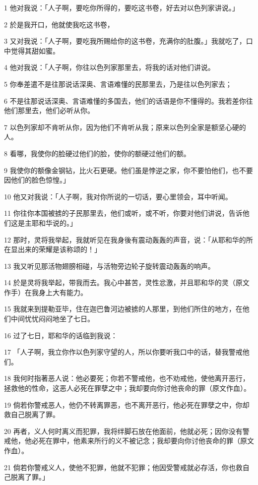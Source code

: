 \par 1 他对我说：「人子啊，要吃你所得的，要吃这书卷，好去对以色列家讲说。」
\par 2 於是我开口，他就使我吃这书卷，
\par 3 又对我说：「人子啊，要吃我所赐给你的这书卷，充满你的肚腹。」我就吃了，口中觉得其甜如蜜。
\par 4 他对我说：「人子啊，你往以色列家那里去，将我的话对他们讲说。
\par 5 你奉差遣不是往那说话深奥、言语难懂的民那里去，乃是往以色列家去；
\par 6 不是往那说话深奥、言语难懂的多国去，他们的话语是你不懂得的。我若差你往他们那里去，他们必听从你。
\par 7 以色列家却不肯听从你，因为他们不肯听从我；原来以色列全家是额坚心硬的人。
\par 8 看哪，我使你的脸硬过他们的脸，使你的额硬过他们的额。
\par 9 我使你的额像金钢钻，比火石更硬。他们虽是悖逆之家，你不要怕他们，也不要因他们的脸色惊惶。」
\par 10 他又对我说：「人子啊，我对你所说的一切话，要心里领会，耳中听闻。
\par 11 你往你本国被掳的子民那里去，他们或听，或不听，你要对他们讲说，告诉他们这是主耶和华说的。」
\par 12 那时，灵将我举起，我就听见在我身後有震动轰轰的声音，说：「从耶和华的所在显出来的荣耀是该称颂的！」
\par 13 我又听见那活物翅膀相碰，与活物旁边轮子旋转震动轰轰的响声。
\par 14 於是灵将我举起，带我而去。我心中甚苦，灵性忿激，并且耶和华的灵（原文作手）在我身上大有能力。
\par 15 我就来到提勒亚毕，住在迦巴鲁河边被掳的人那里，到他们所住的地方，在他们中间忧忧闷闷地坐了七日。
\par 16 过了七日，耶和华的话临到我说：
\par 17 「人子啊，我立你作以色列家守望的人，所以你要听我口中的话，替我警戒他们。
\par 18 我何时指著恶人说：他必要死；你若不警戒他，也不劝戒他，使他离开恶行，拯救他的性命，这恶人必死在罪孽之中；我却要向你讨他丧命的罪（原文作血）。
\par 19 倘若你警戒恶人，他仍不转离罪恶，也不离开恶行，他必死在罪孽之中，你却救自己脱离了罪。
\par 20 再者，义人何时离义而犯罪，我将绊脚石放在他面前，他就必死；因你没有警戒他，他必死在罪中，他素来所行的义不被记念；我却要向你讨他丧命的罪（原文作血）。
\par 21 倘若你警戒义人，使他不犯罪，他就不犯罪；他因受警戒就必存活，你也救自己脱离了罪。」
